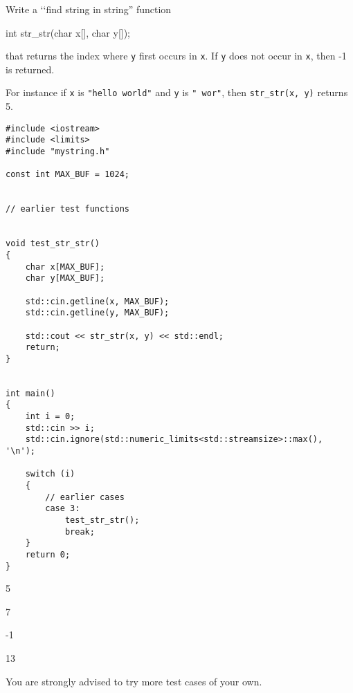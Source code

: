 Write a \lq\lq find string in string'' function
\begin{console}
int str_str(char x[], char y[]);
\end{console}
that returns the index where \verb!y! first occurs in \verb!x!.
If \verb!y! does not occur in \verb!x!, then -1 is returned.

For instance if \verb!x! is \verb!"hello world"!
and \verb!y! is \verb!" wor"!, then
\verb!str_str(x, y)! returns 5.

{\small
\begin{Verbatim}[frame=single,commandchars=\~\!\@]
#include <iostream>
#include <limits>
#include "mystring.h"

const int MAX_BUF = 1024;


// earlier test functions


void test_str_str()
{
    char x[MAX_BUF];
    char y[MAX_BUF];

    std::cin.getline(x, MAX_BUF);
    std::cin.getline(y, MAX_BUF);
    
    std::cout << str_str(x, y) << std::endl;
    return;
}


int main()
{
    int i = 0;
    std::cin >> i;
    std::cin.ignore(std::numeric_limits<std::streamsize>::max(), '\n');

    switch (i)
    {
        // earlier cases
        case 3:
            test_str_str();
            break;
    }
    return 0;
}
\end{Verbatim}
}

\resett

\nextt
\begin{console}[fontsize=\small,commandchars=\\\{\}]
5
\end{console}

\nextt
\begin{console}[fontsize=\small,commandchars=\\\{\}]
7
\end{console}

\nextt
\begin{console}[fontsize=\small,commandchars=\\\{\}]
-1
\end{console}

\nextt
\begin{console}[fontsize=\small,commandchars=\\\{\}]
13
\end{console}

You are strongly advised to try more test cases of your own.
